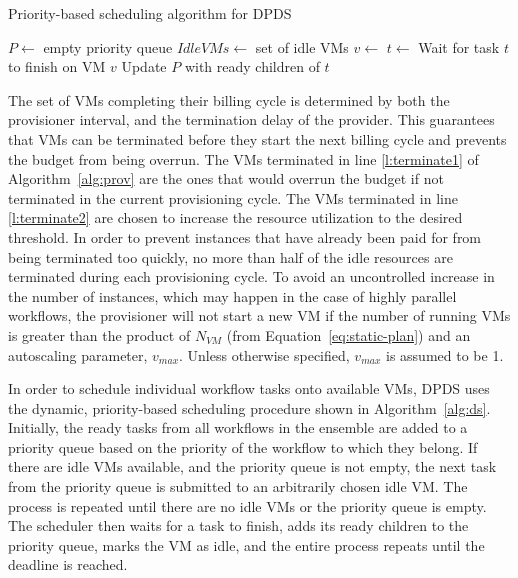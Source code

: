 \documentclass[conference]{IEEEtran}
\begin{document}
\begin{algorithm}[tb]
\caption{Priority-based scheduling algorithm for DPDS}
\label{alg:ds}
{\footnotesize
\begin{algorithmic}[1]
    \State $P\gets$ empty priority queue
  \State $IdleVMs\gets$ set of idle VMs
      \State {} 
    \EndFor
        \State $v\gets$ 
        \State $t\gets$ 
        \State {}
      \EndWhile
      \State Wait for task $t$ to finish on VM $v$
      \State Update $P$ with ready children of $t$
    \State {}
    \EndWhile
\EndProcedure
\end{algorithmic}
}
\end{algorithm}

The set of VMs completing their billing cycle is determined by both
the provisioner interval, and the termination delay of the provider. This
guarantees that VMs can be terminated before they start the next billing cycle
and prevents the budget from being overrun. The VMs terminated in line
\ref{l:terminate1} of Algorithm~\ref{alg:prov} are the ones that would overrun
the budget if not terminated in the current provisioning cycle. The VMs
terminated in line \ref{l:terminate2} are chosen to increase the resource
utilization to the desired threshold. In order to prevent instances that have
already been paid for from being terminated too quickly, no more than half of
the idle resources are terminated during each provisioning cycle. To avoid an
uncontrolled increase in the number of instances, which may happen in the case
of highly parallel workflows, the provisioner will not start a new VM if the
number of running VMs is greater than the product of $N_{VM}$ (from
Equation~\ref{eq:static-plan}) and an autoscaling parameter, $v_{max}$. Unless
otherwise specified, $v_{max}$ is assumed to be 1.

In order to schedule individual workflow tasks onto available VMs, DPDS uses the
dynamic, priority-based scheduling procedure shown in Algorithm~\ref{alg:ds}.
Initially, the ready tasks from all workflows in the ensemble are added to a
priority queue based on the priority of the workflow to which they belong. If
there are idle VMs available, and the priority queue is not empty, the next task
from the priority queue is submitted to an arbitrarily chosen idle VM. The
process is repeated until there are no idle VMs or the priority queue is empty.
The scheduler then waits for a task to finish, adds its ready children to the
priority queue, marks the VM as idle, and the entire process repeats until the
deadline is reached.
\end{document}
